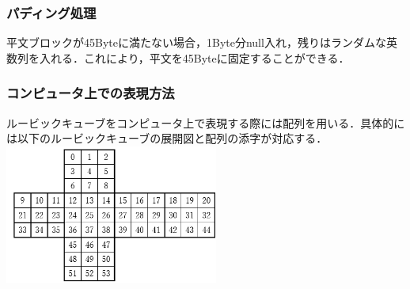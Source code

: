 \documentclass[a4p]{jarticle}
\begin{document}
\subsubsection{パディング処理}
平文ブロックが45Byteに満たない場合，1Byte分null入れ，残りはランダムな英数列を入れる．これにより，平文を45Byteに固定することができる．

\subsubsection{コンピュータ上での表現方法}
ルービックキューブをコンピュータ上で表現する際には配列を用いる．具体的には以下のルービックキューブの展開図と配列の添字が対応する．\\

  \includegraphics[width=7cm]{./tex_pic/seq.jpg}\\
    
\end{document}
